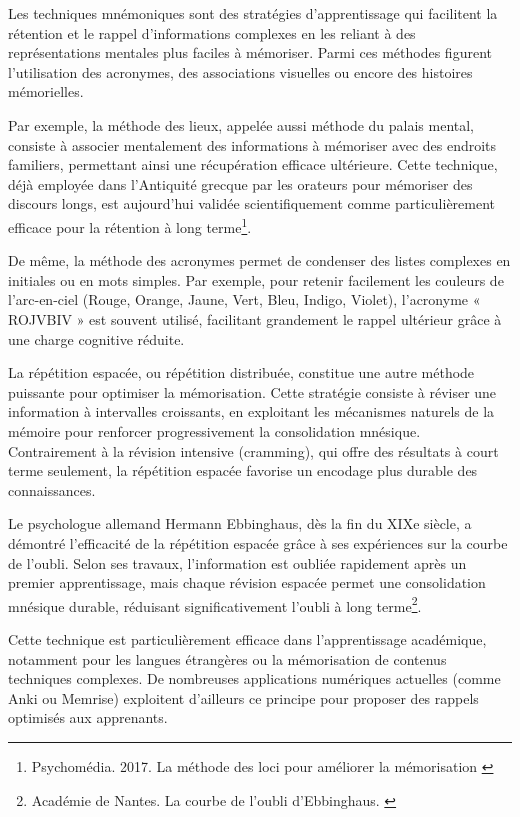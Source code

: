 \documentclass[11pt,a4paper]{report}
\begin{document}
Les techniques mnémoniques sont des stratégies d'apprentissage qui facilitent la rétention et le rappel d'informations complexes en les reliant à des représentations mentales plus faciles à mémoriser. Parmi ces méthodes figurent l'utilisation des acronymes, des associations visuelles ou encore des histoires mémorielles.

Par exemple, la méthode des lieux, appelée aussi méthode du palais mental, consiste à associer mentalement des informations à mémoriser avec des endroits familiers, permettant ainsi une récupération efficace ultérieure. Cette technique, déjà employée dans l’Antiquité grecque par les orateurs pour mémoriser des discours longs, est aujourd’hui validée scientifiquement comme particulièrement efficace pour la rétention à long terme\footnote{Psychomédia. 2017. La méthode des loci pour améliorer la mémorisation \cite{psychomédia}}.

De même, la méthode des acronymes permet de condenser des listes complexes en initiales ou en mots simples. Par exemple, pour retenir facilement les couleurs de l’arc-en-ciel (Rouge, Orange, Jaune, Vert, Bleu, Indigo, Violet), l'acronyme « ROJVBIV » est souvent utilisé, facilitant grandement le rappel ultérieur grâce à une charge cognitive réduite.

La répétition espacée, ou répétition distribuée, constitue une autre méthode puissante pour optimiser la mémorisation. Cette stratégie consiste à réviser une information à intervalles croissants, en exploitant les mécanismes naturels de la mémoire pour renforcer progressivement la consolidation mnésique. Contrairement à la révision intensive (cramming), qui offre des résultats à court terme seulement, la répétition espacée favorise un encodage plus durable des connaissances.

Le psychologue allemand Hermann Ebbinghaus, dès la fin du XIXe siècle, a démontré l’efficacité de la répétition espacée grâce à ses expériences sur la courbe de l’oubli. Selon ses travaux, l'information est oubliée rapidement après un premier apprentissage, mais chaque révision espacée permet une consolidation mnésique durable, réduisant significativement l'oubli à long terme\footnote{Académie de Nantes. La courbe de l'oubli d'Ebbinghaus. \cite{ebbinghaus}}.

Cette technique est particulièrement efficace dans l’apprentissage académique, notamment pour les langues étrangères ou la mémorisation de contenus techniques complexes. De nombreuses applications numériques actuelles (comme Anki ou Memrise) exploitent d’ailleurs ce principe pour proposer des rappels optimisés aux apprenants.
\end{document}
